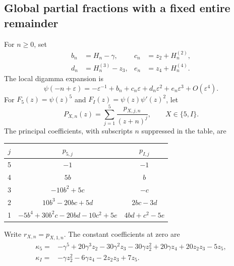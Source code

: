 \subsection{Global partial fractions with a fixed entire remainder}

For $n\geq0$, set
\begin{equation}\label{q5:localcoeffs}
 \begin{aligned}
 b_n&=H_n-\gamma,&
 c_n&=z_2+H_n^{(2)},\\
 d_n&=H_n^{(3)}-z_3,&
 e_n&=z_4+H_n^{(4)}.
 \end{aligned}
\end{equation}
The local digamma expansion is
\[
 \psi(-n+\varepsilon)
 =-\varepsilon^{-1}+b_n+c_n\varepsilon
       +d_n\varepsilon^2+e_n\varepsilon^3+O(\varepsilon^4).
\]
For $F_5(z)=\psi(z)^5$ and $F_I(z)=\psi(z)\psi'(z)^2$, let
\[
 P_{X,n}(z)=\sum_{j=1}^5\frac{p_{X,j,n}}{(z+n)^j},
 \qquad X\in\{5,I\}.
\]
The principal coefficients, with subscripts $n$ suppressed in the table,
are
\begin{center}
\begin{tabular}{c|c|c}
$j$&$p_{5,j}$&$p_{I,j}$\\\hline
5&$-1$&$-1$\\
4&$5b$&$b$\\
3&$-10b^2+5c$&$-c$\\
2&$10b^3-20bc+5d$&$2bc-3d$\\
1&$-5b^4+30b^2c-20bd-10c^2+5e$&$4bd+c^2-5e$
\end{tabular}
\end{center}
Write $r_{X,n}=p_{X,1,n}$.  The constant coefficients at zero are
\begin{align}
 \kappa_5={}&-\gamma^5+20\gamma^3z_2-30\gamma^2z_3
         -30\gamma z_2^2+20\gamma z_4+20z_2z_3-5z_5,
 \label{q5:kappa5}\\
 \kappa_I={}&-\gamma z_2^2-6\gamma z_4-2z_2z_3+7z_5.
 \label{q5:kappaI}
\end{align}

